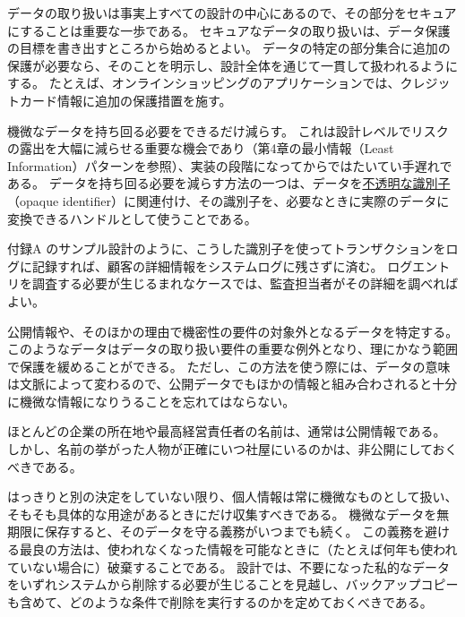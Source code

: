 \documentclass[uplatex]{jsarticle}
\def\label#1{}%
\begin{document}
データの取り扱いは事実上すべての設計の中心にあるので、その部分をセキュアにすることは重要な一歩である。
セキュアなデータの取り扱いは、データ保護の目標を書き出すところから始めるとよい。
データの特定の部分集合に追加の保護が必要なら、そのことを明示し、設計全体を通じて一貫して扱われるようにする。
たとえば、オンラインショッピングのアプリケーションでは、クレジットカード情報に追加の保護措置を施す。

機微なデータを持ち回る必要をできるだけ減らす。
これは設計レベルでリスクの露出を大幅に減らせる重要な機会であり（第4章の最小情報（Least Information）パターンを参照）、実装の段階になってからではたいてい手遅れである。
データを持ち回る必要を減らす方法の一つは、データを\underline{不透明な識別子}（opaque identifier）に関連付け、その識別子を、必要なときに実際のデータに変換できるハンドルとして使うことである。

\begin{exa}[不透明な識別子によるログ記録]\label{exa:ch6-opaque-identifier-logging}
付録A のサンプル設計のように、こうした識別子を使ってトランザクションをログに記録すれば、顧客の詳細情報をシステムログに残さずに済む。
ログエントリを調査する必要が生じるまれなケースでは、監査担当者がその詳細を調べればよい。
\end{exa}

公開情報や、そのほかの理由で機密性の要件の対象外となるデータを特定する。
このようなデータはデータの取り扱い要件の重要な例外となり、理にかなう範囲で保護を緩めることができる。
ただし、この方法を使う際には、データの意味は文脈によって変わるので、公開データでもほかの情報と組み合わされると十分に機微な情報になりうることを忘れてはならない。

\begin{exa}[公開情報と組み合わせによる機微性]\label{exa:ch6-public-context}
ほとんどの企業の所在地や最高経営責任者の名前は、通常は公開情報である。
しかし、名前の挙がった人物が正確にいつ社屋にいるのかは、非公開にしておくべきである。
\end{exa}

はっきりと別の決定をしていない限り、個人情報は常に機微なものとして扱い、そもそも具体的な用途があるときにだけ収集すべきである。
機微なデータを無期限に保存すると、そのデータを守る義務がいつまでも続く。
この義務を避ける最良の方法は、使われなくなった情報を可能なときに（たとえば何年も使われていない場合に）破棄することである。
設計では、不要になった私的なデータをいずれシステムから削除する必要が生じることを見越し、バックアップコピーも含めて、どのような条件で削除を実行するのかを定めておくべきである。

\end{document}
